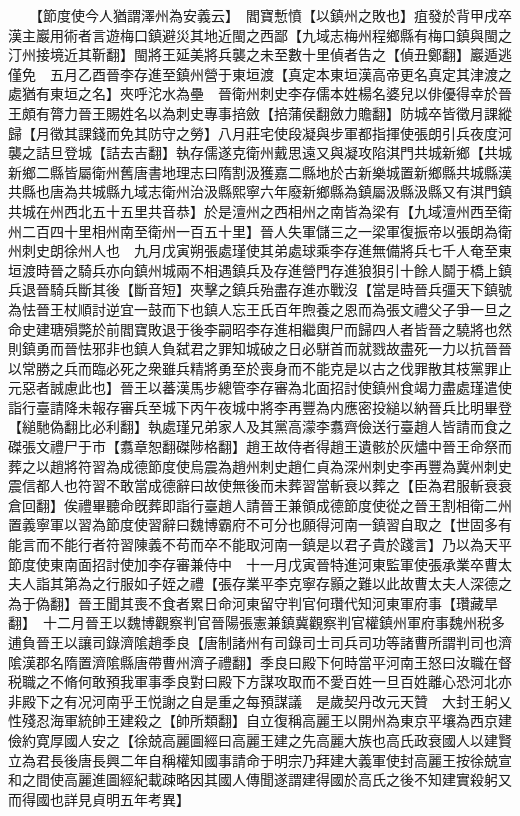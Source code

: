 　　【節度使今人猶謂澤州為安義云】　閻寶慙憤【以鎮州之敗也】疽發於背甲戌卒　漢主巖用術者言遊梅口鎮避災其地近閩之西鄙【九域志梅州程鄉縣有梅口鎮與閩之汀州接境近其靳翻】閩將王延美將兵襲之未至數十里偵者告之【偵丑鄭翻】巖遁逃僅免　五月乙酉晉李存進至鎮州營于東垣渡【真定本東垣漢高帝更名真定其津渡之處猶有東垣之名】夾呼沱水為壘　晉衛州刺史李存儒本姓楊名婆兒以俳優得幸於晉王頗有膂力晉王賜姓名以為刺史專事掊斂【掊蒲侯翻斂力贍翻】防城卒皆徵月課縱歸【月徵其課錢而免其防守之勞】八月莊宅使段凝與步軍都指揮使張朗引兵夜度河襲之詰旦登城【詰去吉翻】執存儒遂克衛州戴思遠又與凝攻陷淇門共城新鄉【共城新鄉二縣皆屬衛州舊唐書地理志曰隋割汲獲嘉二縣地於古新樂城置新鄉縣共城縣漢共縣也唐為共城縣九域志衛州治汲縣熙寧六年廢新鄉縣為鎮屬汲縣汲縣又有淇門鎮共城在州西北五十五里共音恭】於是澶州之西相州之南皆為梁有【九域澶州西至衛州二百四十里相州南至衛州一百五十里】晉人失軍儲三之一梁軍復振帝以張朗為衛州刺史朗徐州人也　九月戊寅朔張處瑾使其弟處球乘李存進無備將兵七千人奄至東垣渡時晉之騎兵亦向鎮州城兩不相遇鎮兵及存進營門存進狼狽引十餘人鬬于橋上鎮兵退晉騎兵斷其後【斷音短】夾擊之鎮兵殆盡存進亦戰沒【當是時晉兵彊天下鎮號為怯晉王杖順討逆宜一鼓而下也鎮人忘王氏百年煦養之恩而為張文禮父子爭一旦之命史建瑭殞斃於前閻寶敗退于後李嗣昭李存進相繼輿尸而歸四人者皆晉之驍將也然則鎮勇而晉怯邪非也鎮人負弑君之罪知城破之日必駢首而就戮故盡死一力以抗晉晉以常勝之兵而臨必死之衆雖兵精將勇至於喪身而不能克是以古之伐罪散其枝黨罪止元惡者誠慮此也】晉王以蕃漢馬步總管李存審為北面招討使鎮州食竭力盡處瑾遣使詣行臺請降未報存審兵至城下丙午夜城中將李再豐為内應密投縋以納晉兵比明畢登【縋馳偽翻比必利翻】執處瑾兄弟家人及其黨高濛李翥齊儉送行臺趙人皆請而食之磔張文禮尸于市【翥章恕翻磔陟格翻】趙王故侍者得趙王遺骸於灰燼中晉王命祭而葬之以趙將符習為成德節度使烏震為趙州刺史趙仁貞為深州刺史李再豐為冀州刺史震信都人也符習不敢當成德辭曰故使無後而未葬習當斬衰以葬之【臣為君服斬衰衰倉回翻】俟禮畢聽命旣葬即詣行臺趙人請晉王兼領成德節度使從之晉王割相衛二州置義寧軍以習為節度使習辭曰魏博霸府不可分也願得河南一鎮習自取之【世固多有能言而不能行者符習陳義不苟而卒不能取河南一鎮是以君子貴於踐言】乃以為天平節度使東南面招討使加李存審兼侍中　十一月戊寅晉特進河東監軍使張承業卒曹太夫人詣其第為之行服如子姪之禮【張存業平李克寧存顥之難以此故曹太夫人深德之為于偽翻】晉王聞其喪不食者累日命河東留守判官何瓚代知河東軍府事【瓚藏旱翻】　十二月晉王以魏博觀察判官晉陽張憲兼鎮冀觀察判官權鎮州軍府事魏州税多逋負晉王以讓司錄濟隂趙季良【唐制諸州有司錄司士司兵司功等諸曹所謂判司也濟隂漢郡名隋置濟隂縣唐帶曹州濟子禮翻】季良曰殿下何時當平河南王怒曰汝職在督税職之不脩何敢預我軍事季良對曰殿下方謀攻取而不愛百姓一旦百姓離心恐河北亦非殿下之有况河南乎王悦謝之自是重之每預謀議　是歲契丹改元天贊　大封王躬乂性殘忍海軍統帥王建殺之【帥所類翻】自立復稱高麗王以開州為東京平壤為西京建儉約寛厚國人安之【徐兢高麗圖經曰高麗王建之先高麗大族也高氏政衰國人以建賢立為君長後唐長興二年自稱權知國事請命于明宗乃拜建大義軍使封高麗王按徐兢宣和之間使高麗進圖經紀載疎略因其國人傳聞遂謂建得國於高氏之後不知建實殺躬又而得國也詳見貞明五年考異】


